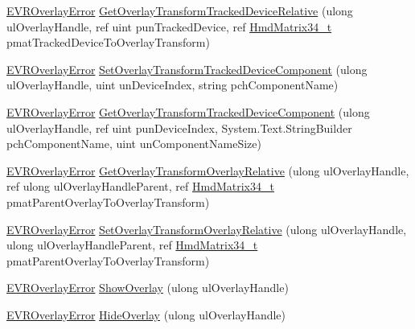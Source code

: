 \begin{DoxyCompactItemize}
\item 
\mbox{\hyperlink{namespace_valve_1_1_v_r_aaee5c5144f42b7969d45b854f51b0c18}{E\+V\+R\+Overlay\+Error}} \mbox{\hyperlink{class_valve_1_1_v_r_1_1_c_v_r_overlay_ad9de7c6f37c6d0102e0f1239e57a94db}{Get\+Overlay\+Transform\+Tracked\+Device\+Relative}} (ulong ul\+Overlay\+Handle, ref uint pun\+Tracked\+Device, ref \mbox{\hyperlink{struct_valve_1_1_v_r_1_1_hmd_matrix34__t}{Hmd\+Matrix34\+\_\+t}} pmat\+Tracked\+Device\+To\+Overlay\+Transform)
\item 
\mbox{\hyperlink{namespace_valve_1_1_v_r_aaee5c5144f42b7969d45b854f51b0c18}{E\+V\+R\+Overlay\+Error}} \mbox{\hyperlink{class_valve_1_1_v_r_1_1_c_v_r_overlay_ac4e364aeb27f4553cc90edf4b3f95837}{Set\+Overlay\+Transform\+Tracked\+Device\+Component}} (ulong ul\+Overlay\+Handle, uint un\+Device\+Index, string pch\+Component\+Name)
\item 
\mbox{\hyperlink{namespace_valve_1_1_v_r_aaee5c5144f42b7969d45b854f51b0c18}{E\+V\+R\+Overlay\+Error}} \mbox{\hyperlink{class_valve_1_1_v_r_1_1_c_v_r_overlay_af663765f0c438d849a9c9e3983bd173d}{Get\+Overlay\+Transform\+Tracked\+Device\+Component}} (ulong ul\+Overlay\+Handle, ref uint pun\+Device\+Index, System.\+Text.\+String\+Builder pch\+Component\+Name, uint un\+Component\+Name\+Size)
\item 
\mbox{\hyperlink{namespace_valve_1_1_v_r_aaee5c5144f42b7969d45b854f51b0c18}{E\+V\+R\+Overlay\+Error}} \mbox{\hyperlink{class_valve_1_1_v_r_1_1_c_v_r_overlay_ac33ac44e9c4371235387157d4435381e}{Get\+Overlay\+Transform\+Overlay\+Relative}} (ulong ul\+Overlay\+Handle, ref ulong ul\+Overlay\+Handle\+Parent, ref \mbox{\hyperlink{struct_valve_1_1_v_r_1_1_hmd_matrix34__t}{Hmd\+Matrix34\+\_\+t}} pmat\+Parent\+Overlay\+To\+Overlay\+Transform)
\item 
\mbox{\hyperlink{namespace_valve_1_1_v_r_aaee5c5144f42b7969d45b854f51b0c18}{E\+V\+R\+Overlay\+Error}} \mbox{\hyperlink{class_valve_1_1_v_r_1_1_c_v_r_overlay_a0e7a0d1d21be7f81f87f5456793024d8}{Set\+Overlay\+Transform\+Overlay\+Relative}} (ulong ul\+Overlay\+Handle, ulong ul\+Overlay\+Handle\+Parent, ref \mbox{\hyperlink{struct_valve_1_1_v_r_1_1_hmd_matrix34__t}{Hmd\+Matrix34\+\_\+t}} pmat\+Parent\+Overlay\+To\+Overlay\+Transform)
\item 
\mbox{\hyperlink{namespace_valve_1_1_v_r_aaee5c5144f42b7969d45b854f51b0c18}{E\+V\+R\+Overlay\+Error}} \mbox{\hyperlink{class_valve_1_1_v_r_1_1_c_v_r_overlay_a68bd4f0b4ad82f2f28a6fa2702bd5151}{Show\+Overlay}} (ulong ul\+Overlay\+Handle)
\item 
\mbox{\hyperlink{namespace_valve_1_1_v_r_aaee5c5144f42b7969d45b854f51b0c18}{E\+V\+R\+Overlay\+Error}} \mbox{\hyperlink{class_valve_1_1_v_r_1_1_c_v_r_overlay_a528c66aaede6c6da73daf0aa1e05186f}{Hide\+Overlay}} (ulong ul\+Overlay\+Handle)

\end{DoxyCompactItemize}
